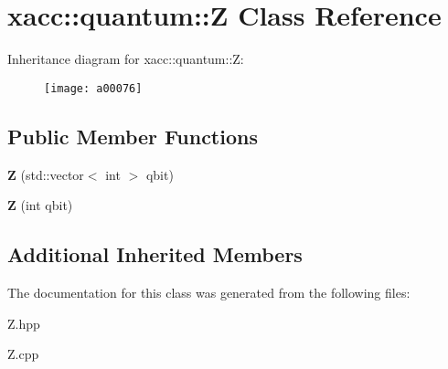 \hypertarget{a00076}{}\section{xacc\+:\+:quantum\+:\+:Z Class Reference}
\label{a00076}
Inheritance diagram for xacc\+:\+:quantum\+:\+:Z\+:\begin{figure}[H]
\begin{center}
\leavevmode
\texttt{[image: a00076]}
\end{center}
\end{figure}
\subsection*{Public Member Functions}
\begin{DoxyCompactItemize}
\item 
{\bfseries Z} (std\+::vector$<$ int $>$ qbit)\hypertarget{a00076_a5f1d311b357faed8c2665fe20cf24aeb}{}\label{a00076_a5f1d311b357faed8c2665fe20cf24aeb}

\item 
{\bfseries Z} (int qbit)\hypertarget{a00076_aa1bb7e533e7595e9ecd06879a2f8d2de}{}\label{a00076_aa1bb7e533e7595e9ecd06879a2f8d2de}

\end{DoxyCompactItemize}
\subsection*{Additional Inherited Members}


The documentation for this class was generated from the following files\+:\begin{DoxyCompactItemize}
\item 
Z.\+hpp\item 
Z.\+cpp\end{DoxyCompactItemize}
